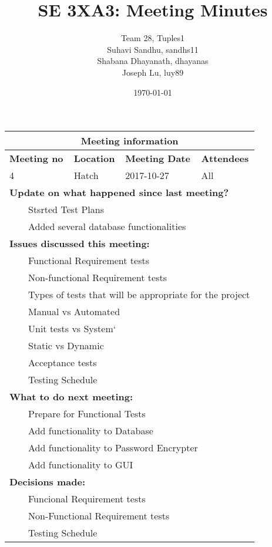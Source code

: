 \documentclass{article}
\title{SE 3XA3: Meeting Minutes}
\author{Team 28, Tuples1
		\\ Suhavi Sandhu, sandhs11
		\\ Shabana Dhayanath, dhayanas
		\\ Joseph Lu, luy89
}
\date{\today}
\newcommand{\tabitem}{~~\llap{\textbullet}~~}
\begin{document}
\begin{tabularx}{\textwidth}{| X || X || X || X |}

    \hline
    \hline
    \multicolumn{4}{|c|}{\textbf{Meeting information}}\\
    \hline
    \hline
        
    \textbf{Meeting no}& \textbf{Location}&\textbf{Meeting Date}&\textbf{Attendees}\\
    
    \hline

    4 & Hatch & 2017-10-27 & All\\
    
    \hline

    \multicolumn{4}{|l|}{\textbf{Update on what happened since last meeting?}}\\

    \multicolumn{4}{|l|}{\tabitem Stsrted Test Plans}\\
    \multicolumn{4}{|l|}{\tabitem Added several database functionalities}\\
	
    \hline

    \multicolumn{4}{|l|}{\textbf{Issues discussed this meeting:}}\\
    
    \multicolumn{4}{|l|}{\tabitem Functional Requirement tests}\\
    \multicolumn{4}{|l|}{\tabitem Non-functional Requirement tests}\\
    \multicolumn{4}{|l|}{\tabitem Types of tests that will be appropriate for the project}\\
    \multicolumn{4}{|l|}{\quad\tabitem Manual vs Automated}\\
    \multicolumn{4}{|l|}{\quad\tabitem Unit tests vs System`}\\
    \multicolumn{4}{|l|}{\quad\tabitem Static vs Dynamic}\\
    \multicolumn{4}{|l|}{\quad\tabitem Acceptance tests}\\
    \multicolumn{4}{|l|}{\tabitem Testing Schedule}\\

    \hline

    \multicolumn{4}{|l|}{\textbf{What to do next meeting:}}\\

    \multicolumn{4}{|l|}{\tabitem Prepare for Functional Tests}\\
    \multicolumn{4}{|l|}{\tabitem Add functionality to Database}\\
    \multicolumn{4}{|l|}{\tabitem Add functionality to Password Encrypter}\\
    \multicolumn{4}{|l|}{\tabitem Add functionality to GUI}\\

    \hline

    \multicolumn{4}{|l|}{\textbf{Decisions made:}}\\
    
    \multicolumn{4}{|l|}{\tabitem Funcional Requirement tests}\\
    \multicolumn{4}{|l|}{\tabitem Non-Functional Requirement tests}\\
    \multicolumn{4}{|l|}{\tabitem Testing Schedule}\\

    \hline


\end{tabularx}
\end{document}
